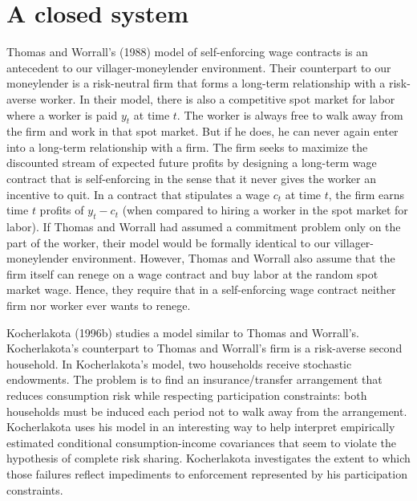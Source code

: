 \section{A closed system}\label{sec:closed}%
Thomas and Worrall's (1988) model
%
of self-enforcing wage contracts is an
antecedent to our villager-moneylender environment.
  Their counterpart to our moneylender is  a risk-neutral firm that forms a long-term relationship
with a risk-averse worker. In their model, there is also a competitive spot
market for labor where a worker is paid $y_t$ at time $t$. The
worker is always free to walk away from the firm and work in that
spot market.  But if he does, he can never again enter into a long-term
relationship with a firm.  The firm seeks to maximize the
discounted stream of expected future profits by designing a
long-term wage contract that is self-enforcing in the sense that it never gives
the worker
an incentive to quit.  In a contract that
stipulates a wage $c_t$ at time $t$, the firm earns time $t$
profits of $y_t - c_t$
(when compared to hiring a worker in the spot market for labor).
If Thomas and Worrall had assumed a commitment problem only on the part of
the worker, their model  would be formally identical to our
villager-moneylender environment.
  However, Thomas and Worrall also assume that
the firm itself can renege on a wage contract and buy labor at the
random spot market wage. Hence, they require that in a self-enforcing wage contract
 neither firm nor worker ever wants to
renege.

Kocherlakota
%
(1996b) studies a model similar to Thomas and Worrall's. %
 Kocherlakota's  counterpart to Thomas and Worrall's   firm is  a  risk-averse second household.
  In Kocherlakota's  model, two
 households
receive stochastic endowments. The  problem
is  to find an insurance/transfer arrangement that reduces
consumption risk while respecting participation constraints: both households must be induced each period not
to walk away from the arrangement. Kocherlakota
uses his model in an interesting way to help interpret empirically
estimated conditional consumption-income covariances that seem to
violate the hypothesis of complete risk sharing. Kocherlakota
investigates the extent to which those failures reflect
impediments to enforcement represented by his participation
constraints. 


